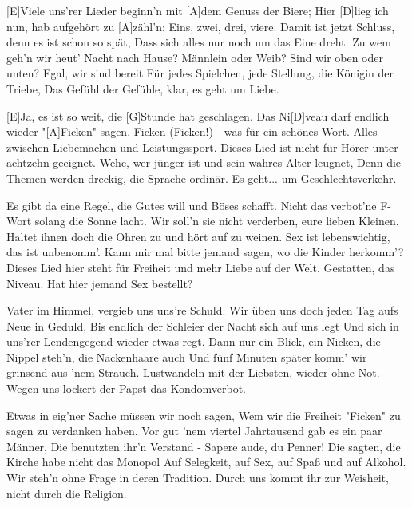 

\begin{guitar}
	[E]Viele uns'rer Lieder beginn'n mit [A]dem Genuss der Biere;
	Hier [D]lieg ich nun, hab aufgehört zu [A]zähl'n: Eins, zwei, drei, viere.
	Damit ist jetzt Schluss, denn es ist schon so spät,
	Dass sich alles nur noch um das Eine dreht.
	Zu wem geh'n wir heut' Nacht nach Hause? Männlein oder Weib?
	Sind wir oben oder unten? Egal, wir sind bereit
	Für jedes Spielchen, jede Stellung, die Königin der Triebe,
	Das Gefühl der Gefühle, klar, es geht um Liebe.
	
	[E]Ja, es ist so weit, die [G]Stunde hat geschlagen.
	Das Ni[D]veau darf endlich wieder "[A]Ficken" sagen.
	Ficken (Ficken!) - was für ein schönes Wort.
	Alles zwischen Liebemachen und Leistungssport.
	Dieses Lied ist nicht für Hörer unter achtzehn geeignet.
	Wehe, wer jünger ist und sein wahres Alter leugnet,
	Denn die Themen werden dreckig, die Sprache ordinär.
	Es geht... um Geschlechtsverkehr.
	
	Es gibt da eine Regel, die Gutes will und Böses schafft.
	Nicht das verbot'ne F-Wort solang die Sonne lacht.
	Wir soll'n sie nicht verderben, eure lieben Kleinen.
	Haltet ihnen doch die Ohren zu und hört auf zu weinen.
	Sex ist lebenswichtig, das ist unbenomm'.
	Kann mir mal bitte jemand sagen, wo die Kinder herkomm'?
	Dieses Lied hier steht für Freiheit und mehr Liebe auf der Welt.
	Gestatten, das Niveau. Hat hier jemand Sex bestellt?
	
	 
	
	\pagebreak
	
	Vater im Himmel, vergieb uns uns're Schuld.
	Wir üben uns doch jeden Tag aufs Neue in Geduld,
	Bis endlich der Schleier der Nacht sich auf uns legt
	Und sich in uns'rer Lendengegend wieder etwas regt.
	Dann nur ein Blick, ein Nicken, die Nippel steh'n, die Nackenhaare auch
	Und fünf Minuten später komm' wir grinsend aus 'nem Strauch.
	Lustwandeln mit der Liebsten, wieder ohne Not.
	Wegen uns lockert der Papst das Kondomverbot.
	
	 
	
	Etwas in eig'ner Sache müssen wir noch sagen,
	Wem wir die Freiheit "Ficken" zu sagen zu verdanken haben.
	Vor gut 'nem viertel Jahrtausend gab es ein paar Männer,
	Die benutzten ihr'n Verstand - Sapere aude, du Penner!
	Die sagten, die Kirche habe nicht das Monopol
	Auf Selegkeit, auf Sex, auf Spaß und auf Alkohol.
	Wir steh'n ohne Frage in deren Tradition.
	Durch uns kommt ihr zur Weisheit, nicht durch die Religion.
	

\end{guitar}
